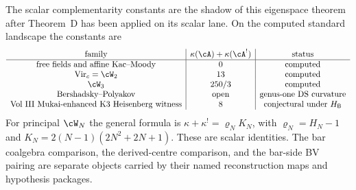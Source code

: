 The scalar complementarity constants are the shadow of this
eigenspace theorem after Theorem~D has been applied on its scalar
lane. On the computed standard landscape the constants are
\[
\begin{array}{c|c|c}
\text{family} & \kappa(\cA)+\kappa(\cA^!) & \text{status} \\ \hline
\text{free fields and affine Kac--Moody} & 0 & \text{computed} \\
\mathrm{Vir}_c=\cW_2 & 13 & \text{computed} \\
\cW_3 & 250/3 & \text{computed} \\
\text{Bershadsky--Polyakov} & \text{open} & \text{genus-one DS curvature} \\
\text{Vol III Mukai-enhanced K3 Heisenberg witness} & 8 &
\text{conjectural under }H_{\mathsf B}
\end{array}
\]
For principal $\cW_N$ the general formula is
$\kappa+\kappa^!=\varrho_NK_N$, with
$\varrho_N=H_N-1$ and
$K_N=2(N-1)(2N^2+2N+1)$. These are scalar identities.  The bar
coalgebra comparison, the derived-centre comparison, and the bar-side
BV pairing are separate objects carried by their named reconstruction
maps and hypothesis packages.

